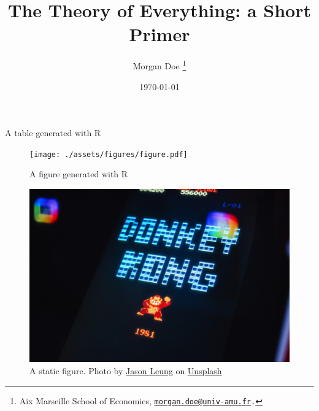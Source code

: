 \documentclass[11pt]{article}
\title{
    The Theory of Everything: a Short Primer
}
\author{
    Morgan Doe
    \thanks{
        Aix Marseille School of Economics, {\tt \href{mailto:morgan.doe@univ-amu.fr}{morgan.doe@univ-amu.fr}.}
    }
}
\date{\today}
\theoremstyle{definition}
\theoremstyle{remark}
\begin{document}
\sloppy %

\if{}
    \maketitle
        
\fi


\begin{table}[H]
  \centering
  
  \caption{A table generated with R}
  \label{tab:r_table}
\end{table}

\begin{figure}
  \centering
  \texttt{[image: ./assets/figures/figure.pdf]}
  \caption{A figure generated with R}
  \label{fig:r_figure}
\end{figure}

\begin{figure}
  \centering
  \includegraphics[width=\textwidth]{./assets/static/dk.jpg}
  \caption{A static figure. Photo by \href{https://unsplash.com/@ninjason?utm_content=creditCopyText&utm_medium=referral&utm_source=unsplash}{Jason Leung} on \href{https://unsplash.com/photos/donkey-kong-arcade-game-screen-with-1981-date-c5tiCWrZADc?utm_content=creditCopyText&utm_medium=referral&utm_source=unsplash}{Unsplash}
  }
  \label{fig:nice_figure}
\end{figure}


\newpage
%  
% 

\newpage

\end{document}
